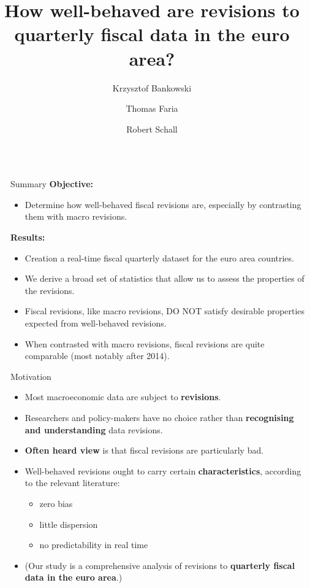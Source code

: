 \documentclass[final]{beamer}
\title{How well-behaved are revisions to quarterly fiscal data in the euro area?}
\author{Krzysztof Bankowski \inst{1} \and Thomas Faria \inst{2} \and Robert Schall \inst{3}}
\institute[shortinst]{\inst{1} European Central Bank \samelineand \inst{2} Insee \samelineand \inst{3} European University Institute}
\newlength{\sepwidth}
\newlength{\colwidth}
\newcommand{\separatorcolumn}{\begin{column}{\sepwidth}\end{column}}
\begin{document}
\begin{frame}[t]
\begin{columns}[t]
\separatorcolumn

\begin{column}{\colwidth}
 
  \begin{alertblock}{Summary}
    \textbf{Objective:}
    \begin{itemize}
      \item Determine how well-behaved fiscal revisions are, especially by contrasting them with macro revisions.
    \end{itemize}

    \textbf{Results:}
    \begin{itemize}
      \item Creation a real-time fiscal quarterly dataset for the euro area countries.
      \item We derive a broad set of statistics that allow us to assess the properties of the revisions.
      \item Fiscal revisions, like macro revisions, DO NOT satisfy desirable properties expected from well-behaved revisions.
      \item When contrasted with macro revisions, fiscal revisions are quite comparable (most notably after 2014).
    \end{itemize}

  \end{alertblock}

  \begin{block}{Motivation}

    \begin{itemize}
      \item Most macroeconomic data are subject to \textbf{revisions}.
      \item Researchers and policy-makers have no choice rather than \textbf{recognising and understanding} data revisions.
      \item \textbf{Often heard view} is that fiscal revisions are particularly bad.
      \item Well-behaved revisions ought to carry certain \textbf{characteristics}, according to the relevant literature:
      \begin{itemize}
        \item zero bias
        \item little dispersion 
        \item no predictability in real time
      \end{itemize}
      \item (Our study is a comprehensive analysis of revisions to \textbf{quarterly fiscal data in the euro area}.)
    \end{itemize}
  \end{block}


\end{column}
\end{columns}
\end{frame}
\end{document}
